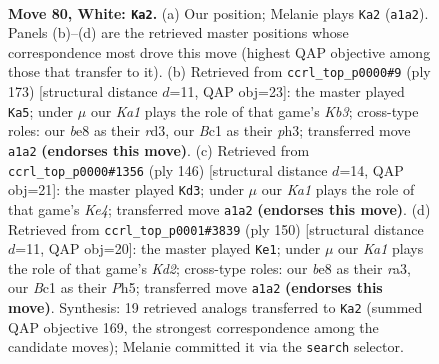 \documentclass[11pt]{article}
\begin{document}
\clearpage

\begin{figure}[p]\centering
\begin{subfigure}{0.46\textwidth}\centering
\resizebox{\linewidth}{!}{%
\newchessgame
\chessboard[
  setfen={4b2k/8/1R6/1P6/8/8/2p3r1/K1B5 w - - 3 80},
  showmover=false,
  pgfstyle=straightmove, color=movearrow, markmove={a1-a2}
]}
\caption{}
\end{subfigure}\hfill
\begin{subfigure}{0.46\textwidth}\centering
\resizebox{\linewidth}{!}{%
\newchessgame
\chessboard[
  setfen={8/8/1k6/8/8/p2R3P/r7/6K1 b - - 3 87},
  showmover=false,
  pgfstyle=straightmove, color=movearrow, markmove={b6-a5}
]}
\caption{}
\end{subfigure}
\\[4pt]
\begin{subfigure}{0.46\textwidth}\centering
\resizebox{\linewidth}{!}{%
\newchessgame
\chessboard[
  setfen={8/4k3/6p1/2R3P1/4K3/8/3b4/8 w - - 15 74},
  showmover=false,
  pgfstyle=straightmove, color=movearrow, markmove={e4-d3}
]}
\caption{}
\end{subfigure}\hfill
\begin{subfigure}{0.46\textwidth}\centering
\resizebox{\linewidth}{!}{%
\newchessgame
\chessboard[
  setfen={8/6k1/PR6/7P/8/r4p2/3K4/8 w - - 0 76},
  showmover=false,
  pgfstyle=straightmove, color=movearrow, markmove={d2-e1}
]}
\caption{}
\end{subfigure}
\caption{\textbf{Move 80, White: \texttt{Ka2}.} (a) Our position; Melanie plays \texttt{Ka2} (\texttt{a1a2}). Panels (b)--(d) are the retrieved master positions whose correspondence most drove this move (highest QAP objective among those that transfer to it). (b) Retrieved from \texttt{ccrl\_top\_p0000\#9} (ply 173) [structural distance $d$=11, QAP obj=23]: the master played \texttt{Ka5}; under $\mu$ our \emph{Ka1} plays the role of that game's \emph{Kb3}; cross-type roles: our \emph{b}e8 as their \emph{r}d3, our \emph{B}c1 as their \emph{p}h3; transferred move \texttt{a1a2} \textbf{(endorses this move)}. (c) Retrieved from \texttt{ccrl\_top\_p0000\#1356} (ply 146) [structural distance $d$=14, QAP obj=21]: the master played \texttt{Kd3}; under $\mu$ our \emph{Ka1} plays the role of that game's \emph{Ke4}; transferred move \texttt{a1a2} \textbf{(endorses this move)}. (d) Retrieved from \texttt{ccrl\_top\_p0001\#3839} (ply 150) [structural distance $d$=11, QAP obj=20]: the master played \texttt{Ke1}; under $\mu$ our \emph{Ka1} plays the role of that game's \emph{Kd2}; cross-type roles: our \emph{b}e8 as their \emph{r}a3, our \emph{B}c1 as their \emph{P}h5; transferred move \texttt{a1a2} \textbf{(endorses this move)}. Synthesis: 19 retrieved analogs transferred to \texttt{Ka2} (summed QAP objective 169, the strongest correspondence among the candidate moves); Melanie committed it via the \texttt{search} selector.}
\label{fig:thought-m158}
\end{figure}
\end{document}

